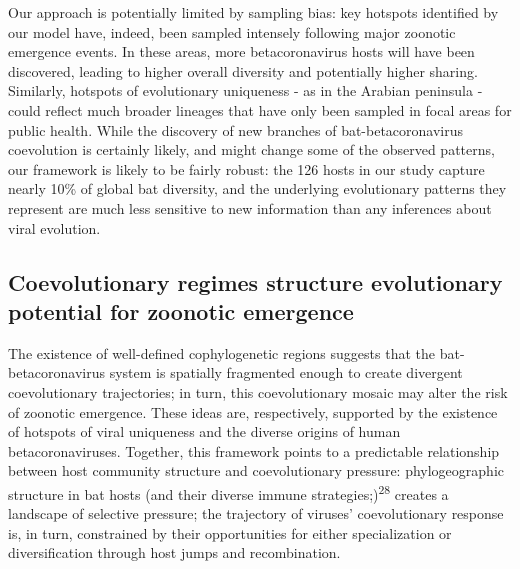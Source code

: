 \documentclass[10pt,oneside]{article}
\begin{document}
Our approach is potentially limited by sampling bias: key hotspots
identified by our model have, indeed, been sampled intensely following
major zoonotic emergence events. In these areas, more betacoronavirus
hosts will have been discovered, leading to higher overall diversity and
potentially higher sharing. Similarly, hotspots of evolutionary
uniqueness - as in the Arabian peninsula - could reflect much broader
lineages that have only been sampled in focal areas for public health.
While the discovery of new branches of bat-betacoronavirus coevolution
is certainly likely, and might change some of the observed patterns, our
framework is likely to be fairly robust: the 126 hosts in our study
capture nearly 10\% of global bat diversity, and the underlying
evolutionary patterns they represent are much less sensitive to new
information than any inferences about viral evolution.

\hypertarget{coevolutionary-regimes-structure-evolutionary-potential-for-zoonotic-emergence}{%
\subsection{Coevolutionary regimes structure evolutionary potential for
zoonotic
emergence}\label{coevolutionary-regimes-structure-evolutionary-potential-for-zoonotic-emergence}}

The existence of well-defined cophylogenetic regions suggests that the
bat-betacoronavirus system is spatially fragmented enough to create
divergent coevolutionary trajectories; in turn, this coevolutionary
mosaic may alter the risk of zoonotic emergence. These ideas are,
respectively, supported by the existence of hotspots of viral uniqueness
and the diverse origins of human betacoronaviruses. Together, this
framework points to a predictable relationship between host community
structure and coevolutionary pressure: phylogeographic structure in bat
hosts (and their diverse immune strategies;)\textsuperscript{28} creates
a landscape of selective pressure; the trajectory of viruses'
coevolutionary response is, in turn, constrained by their opportunities
for either specialization or diversification through host jumps and
recombination.
\end{document}
